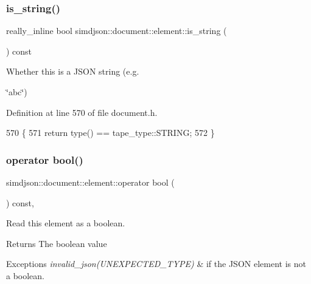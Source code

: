 \subsubsection{\texorpdfstring{is\+\_\+string()}{is\_string()}}
{\footnotesize\ttfamily really\+\_\+inline bool simdjson\+::document\+::element\+::is\+\_\+string (\begin{DoxyParamCaption}{ }\end{DoxyParamCaption}) const\hspace{0.3cm}{\ttfamily [noexcept]}}



Whether this is a J\+S\+ON string (e.\+g. 

\char`\"{}abc\char`\"{}) 

Definition at line 570 of file document.\+h.


\begin{DoxyCode}
570                                                              \{
571   \textcolor{keywordflow}{return} type() == tape\_type::STRING;
572 \}
\end{DoxyCode}
\mbox{\label{classsimdjson_1_1document_1_1element_a1157c9af47ff2049e8f9fd1e19003596}} 
\subsubsection{\texorpdfstring{operator bool()}{operator bool()}}
{\footnotesize\ttfamily simdjson\+::document\+::element\+::operator bool (\begin{DoxyParamCaption}{ }\end{DoxyParamCaption}) const\hspace{0.3cm}{\ttfamily [inline]}, {\ttfamily [noexcept]}}



Read this element as a boolean. 

\begin{DoxyReturn}{Returns}
The boolean value 
\end{DoxyReturn}

\begin{DoxyExceptions}{Exceptions}
{\em invalid\+\_\+json(\+U\+N\+E\+X\+P\+E\+C\+T\+E\+D\+\_\+\+T\+Y\+P\+E)} & if the J\+S\+ON element is not a boolean. \\
\hline
\end{DoxyExceptions}


